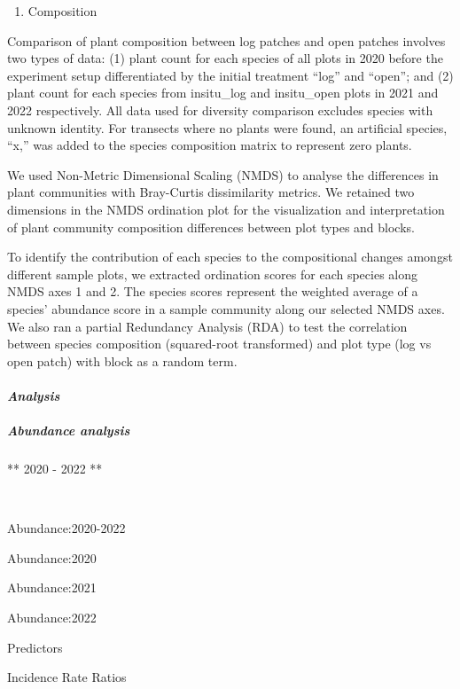 \documentclass[
]{article}
\providecommand{\tightlist}{%
  \setlength{\itemsep}{0pt}\setlength{\parskip}{0pt}}
\begin{document}
\begin{enumerate}
\def\labelenumi{\arabic{enumi}.}
\setcounter{enumi}{2}
\tightlist
\item
  Composition
\end{enumerate}

Comparison of plant composition between log patches and open patches
involves two types of data: (1) plant count for each species of all
plots in 2020 before the experiment setup differentiated by the initial
treatment ``log'' and ``open''; and (2) plant count for each species
from insitu\_log and insitu\_open plots in 2021 and 2022 respectively.
All data used for diversity comparison excludes species with unknown
identity. For transects where no plants were found, an artificial
species, ``x,'' was added to the species composition matrix to represent
zero plants.

We used Non-Metric Dimensional Scaling (NMDS) to analyse the differences
in plant communities with Bray-Curtis dissimilarity metrics. We retained
two dimensions in the NMDS ordination plot for the visualization and
interpretation of plant community composition differences between plot
types and blocks.

To identify the contribution of each species to the compositional
changes amongst different sample plots, we extracted ordination scores
for each species along NMDS axes 1 and 2. The species scores represent
the weighted average of a species' abundance score in a sample community
along our selected NMDS axes. We also ran a partial Redundancy Analysis
(RDA) to test the correlation between species composition (squared-root
transformed) and plot type (log vs open patch) with block as a random
term.

\hypertarget{analysis}{%
\paragraph{\texorpdfstring{\emph{Analysis}}{Analysis }}\label{analysis}}

\hypertarget{abundance-analysis}{%
\subparagraph{Abundance analysis}\label{abundance-analysis}}

** 2020 - 2022 **

~

Abundance:2020-2022

Abundance:2020

Abundance:2021

Abundance:2022

Predictors

Incidence Rate Ratios
\end{document}
